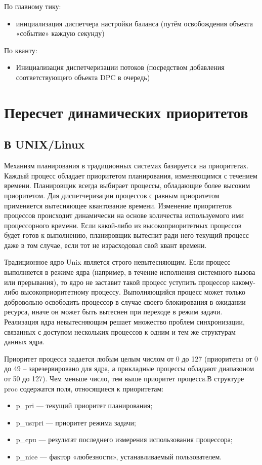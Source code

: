 По главному тику:
\begin{itemize}
	\item инициализация диспетчера настройки баланса (путём освобождения объекта «событие» каждую секунду)
\end{itemize}

По кванту:
\begin{itemize}
	\item Инициализация диспетчеризации потоков (посредством добавления соответствующего объекта DPC в очередь)
\end{itemize}

\chapter{Пересчет динамических приоритетов}
\section{В UNIX/Linux}
Механизм планирования в традиционных системах базируется на приоритетах. Каждый процесс обладает приоритетом планирования, изменяющимся с течением времени. Планировщик всегда выбирает процессы, обладающие более высоким приоритетом. Для диспетчеризации процессов с равным приоритетом применяется вытесняющее квантование времени. Изменение приоритетов процессов происходит динамически на основе количества используемого ими процессорного времени. Если какой-либо из высокоприоритетных процессов будет готов к выполнению, планировщик вытеснит ради него текущий процесс даже в том случае, если тот не израсходовал свой квант времени. 

Традиционное ядро Unix является строго невытесняющим. Если процесс выполняется в режиме ядра (например, в течение исполнения системного вызова или прерывания), то ядро не заставит такой процесс уступить процессор какому-либо высокоприоритетному процессу. Выполняющийся процесс может только добровольно освободить процессор в случае своего блокирования в ожидании ресурса, иначе он может быть вытеснен при переходе в режим задачи. Реализация ядра невытесняющим решает множество проблем синхронизации, связанных с доступом нескольких процессов к одним и тем же структурам данных ядра.

Приоритет процесса задается любым целым числом от 0 до 127 (приоритеты от 0 до 49 – зарезервировано для ядра, а прикладные процессы обладают диапазоном от 50 до 127). Чем меньше число, тем выше приоритет процесса.В структуре proc содержатся поля, относящиеся к приоритетам:
\begin{itemize}
	\item p\_pri — текущий приоритет планирования;
	\item p\_usrpri — приоритет режима задачи;
	\item p\_cpu — результат последнего измерения использования процессора;
	\item p\_nice — фактор «любезности», устанавливаемый пользователем.
\end{itemize}

